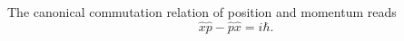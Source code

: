 \documentclass{article}
\begin{document}
The canonical commutation relation of position and momentum reads
\begin{equation}
\hat x \hat p - \hat p \hat x = i\hbar .
\label{eq:ccr}
\end{equation}
\end{document}
